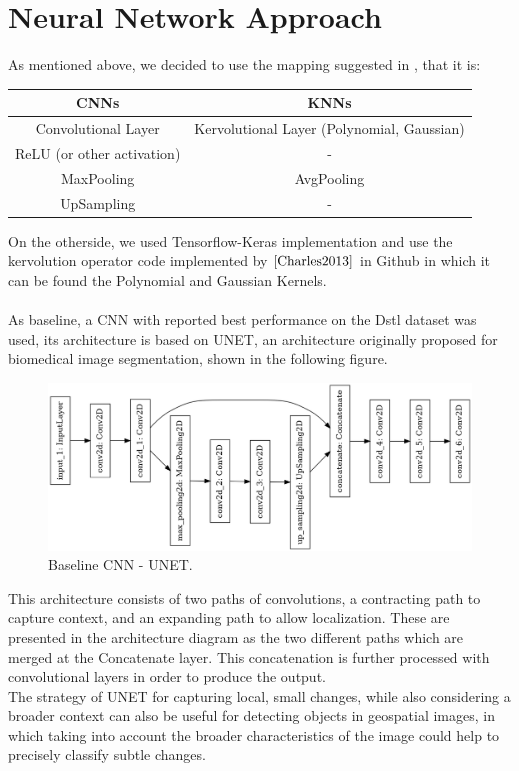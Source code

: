 \documentclass{article}
\begin{document}
\section{Neural Network Approach}
As mentioned above, we decided to use the mapping suggested in \cite{DBLP:journals/corr/abs-1904-03955}, that it is:
\begin{center}
 \begin{tabular}{ |c|c|} 
 \hline
 CNNs & KNNs \\  
 \hline
 \hline
Convolutional Layer & Kervolutional Layer (Polynomial, Gaussian) \\
ReLU (or other activation) & - \\
MaxPooling & AvgPooling \\
UpSampling & - \\ 
\hline
\end{tabular}
\end{center}
On the otherside, we used Tensorflow-Keras implementation and use the kervolution operator code implemented by $\cite{Charles2013}$ in Github in which it can be found the Polynomial and Gaussian Kernels.\\
\\
As baseline, a CNN with reported best performance on the Dstl dataset was used, its architecture is based on UNET, an architecture originally proposed for biomedical image segmentation, shown in the following figure.

\begin{figure}[h!]
    \center
    \includegraphics[width=0.65\linewidth]{Images/model.png}
    \caption{Baseline CNN - UNET.}
\end{figure}

This architecture consists of two paths of convolutions, a contracting path to capture context, and an expanding path to allow localization. These are presented in the architecture diagram as the two different paths which are merged at the Concatenate layer. This concatenation is further processed with convolutional layers in order to produce the output.\\

The strategy of UNET for capturing local, small changes, while also considering a broader context can also be useful for detecting objects in geospatial images, in which taking into account the broader characteristics of the image could help to precisely classify subtle changes.\\
\end{document}
